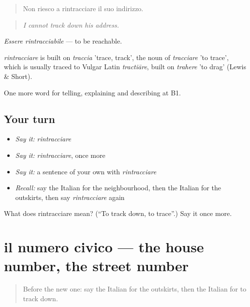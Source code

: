 \begin{quote}
Non riesco a rintracciare il suo indirizzo.
\end{quote}

\begin{quote}
\emph{I cannot track down his address.}
\end{quote}

\emph{Essere rintracciabile} — to be reachable.

\begin{cousinweb}
\emph{rintracciare} is built on \emph{traccia} 'trace, track', the noun of \emph{tracciare} 'to trace', which is usually traced to Vulgar Latin \emph{tractiāre}, built on \emph{trahere} 'to drag' (Lewis \& Short).
\end{cousinweb}

\begin{grammarlens}[title={What you've built}]
One more word for telling, explaining and describing at B1.
\end{grammarlens}

\subsection*{Your turn}
\begin{itemize}
\raggedright
  \item \emph{Say it:} \emph{rintracciare}
  \item \emph{Say it:} \emph{rintracciare}, once more
  \item \emph{Say it:} a sentence of your own with \emph{rintracciare}
  \item \emph{Recall:} say the Italian for the neighbourhood, then the Italian for the outskirts, then say \emph{rintracciare} again
\end{itemize}

\begin{tcolorbox}[breakable,colback=teal!4,colframe=teal!35!black,title={Before you move on}]
What does rintracciare mean? (\textquotedblleft{}To track down, to trace\textquotedblright{}.) Say it once more.
\end{tcolorbox}
\section[il numero civico]{il numero civico — the house number, the street number}

\label{lesson:IT-C444-numero-civico}



\begin{quote}
Before the new one: say the Italian for the outskirts, then the Italian for to track down.
\end{quote}

